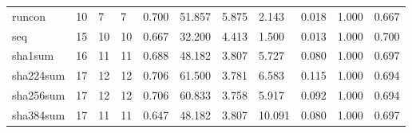 \begin{longtable}{lp{1.2cm}p{1.2cm}p{1.2cm}p{1.2cm}p{1.2cm}p{1.2cm}p{1.2cm}p{1.2cm}p{1.2cm}p{1.2cm}}
runcon    &                           10 &                  7 &                                 7 &                                      0.700 &                                 51.857 &                                        5.875 &                             2.143 &                                   0.018 &                              1.000 &                                              0.667 \\
seq       &                           15 &                 10 &                                10 &                                      0.667 &                                 32.200 &                                        4.413 &                             1.500 &                                   0.013 &                              1.000 &                                              0.700 \\
sha1sum   &                           16 &                 11 &                                11 &                                      0.688 &                                 48.182 &                                        3.807 &                             5.727 &                                   0.080 &                              1.000 &                                              0.697 \\
sha224sum &                           17 &                 12 &                                12 &                                      0.706 &                                 61.500 &                                        3.781 &                             6.583 &                                   0.115 &                              1.000 &                                              0.694 \\
sha256sum &                           17 &                 12 &                                12 &                                      0.706 &                                 60.833 &                                        3.758 &                             5.917 &                                   0.092 &                              1.000 &                                              0.694 \\
sha384sum &                           17 &                 11 &                                11 &                                      0.647 &                                 48.182 &                                        3.807 &                            10.091 &                                   0.080 &                              1.000 &                                              0.697 \\

\end{longtable}
